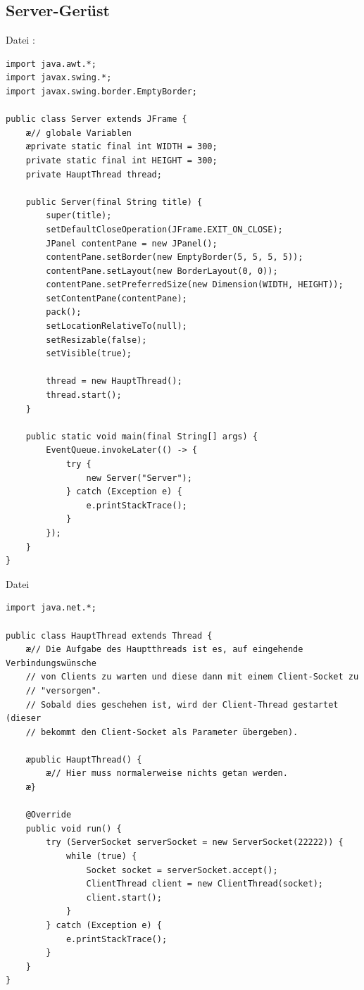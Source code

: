 \subsection{Server-Gerüst}

Datei :

\begin{lstlisting}
import java.awt.*;
import javax.swing.*;
import javax.swing.border.EmptyBorder;

public class Server extends JFrame {
    æ// globale Variablen
    æprivate static final int WIDTH = 300;
    private static final int HEIGHT = 300;
    private HauptThread thread;

    public Server(final String title) {
        super(title);
        setDefaultCloseOperation(JFrame.EXIT_ON_CLOSE);
        JPanel contentPane = new JPanel();
        contentPane.setBorder(new EmptyBorder(5, 5, 5, 5));
        contentPane.setLayout(new BorderLayout(0, 0));
        contentPane.setPreferredSize(new Dimension(WIDTH, HEIGHT));
        setContentPane(contentPane);
        pack();
        setLocationRelativeTo(null);
        setResizable(false);
        setVisible(true);
		
        thread = new HauptThread();
        thread.start();
    }
	
    public static void main(final String[] args) {
        EventQueue.invokeLater(() -> {
            try {
                new Server("Server");
            } catch (Exception e) {
                e.printStackTrace();
            }
        });
    }
}
\end{lstlisting}

\vfill

Datei 

\begin{lstlisting}
import java.net.*;

public class HauptThread extends Thread {
    æ// Die Aufgabe des Hauptthreads ist es, auf eingehende Verbindungswünsche
    // von Clients zu warten und diese dann mit einem Client-Socket zu
    // "versorgen".
    // Sobald dies geschehen ist, wird der Client-Thread gestartet (dieser
    // bekommt den Client-Socket als Parameter übergeben).

    æpublic HauptThread() {
        æ// Hier muss normalerweise nichts getan werden.
    æ}

    @Override
    public void run() {
        try (ServerSocket serverSocket = new ServerSocket(22222)) {
            while (true) {
                Socket socket = serverSocket.accept();
                ClientThread client = new ClientThread(socket);
                client.start();
            }
        } catch (Exception e) {
            e.printStackTrace();
        }
    }
}
\end{lstlisting}

